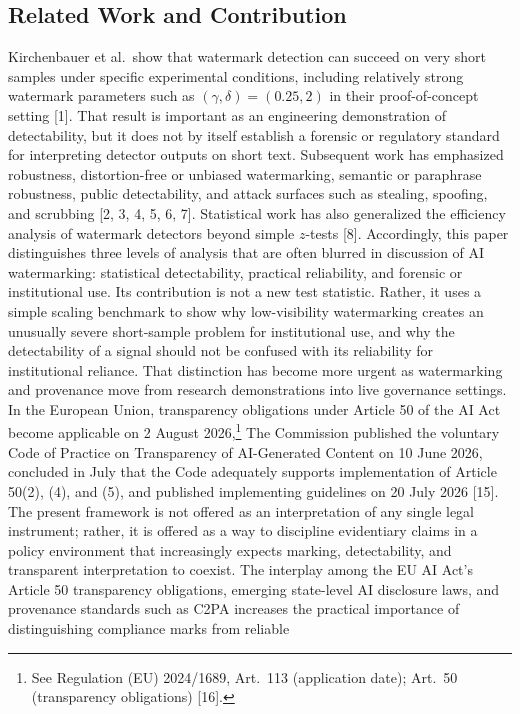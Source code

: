 \documentclass[11pt]{article}
\begin{document}
\subsection{Related Work and Contribution}
Kirchenbauer et al.\ show that watermark detection can succeed on very short
samples under specific experimental conditions, including relatively strong
watermark parameters such as $(\gamma, \delta) = (0.25, 2)$ in their
proof-of-concept setting [1]. That result is important as an engineering
demonstration of detectability, but it does not by itself establish a forensic or
regulatory standard for interpreting detector outputs on short text. Subsequent
work has emphasized robustness, distortion-free or unbiased watermarking, semantic
or paraphrase robustness, public detectability, and attack surfaces such as
stealing, spoofing, and scrubbing [2, 3, 4, 5, 6, 7]. Statistical work has also
generalized the efficiency analysis of watermark detectors beyond simple
$z$-tests [8].
Accordingly, this paper distinguishes three levels of analysis that are often
blurred in discussion of AI watermarking: statistical detectability, practical
reliability, and forensic or institutional use. Its contribution is not a new test
statistic. Rather, it uses a simple scaling benchmark to show why low-visibility
watermarking creates an unusually severe short-sample problem for institutional
use, and why the detectability of a signal should not be confused with its
reliability for institutional reliance.
That distinction has become more urgent as watermarking and provenance move from
research demonstrations into live governance settings. In the European Union,
transparency obligations under Article 50 of the AI Act become applicable on 2
August 2026,\footnote{See Regulation (EU) 2024/1689, Art.\ 113 (application date);
Art.\ 50 (transparency obligations) [16].} The Commission published the voluntary
Code of Practice on Transparency of AI-Generated Content on 10 June 2026,
concluded in July that the Code adequately supports implementation of Article
50(2), (4), and (5), and published implementing guidelines on 20 July 2026 [15].
The present framework is not offered as an interpretation of any single legal
instrument; rather, it is offered as a way to discipline evidentiary claims in a
policy environment that increasingly expects marking, detectability, and
transparent interpretation to coexist.
The interplay among the EU AI Act's Article 50 transparency obligations, emerging
state-level AI disclosure laws, and provenance standards such as C2PA increases
the practical importance of distinguishing compliance marks from reliable
\end{document}
